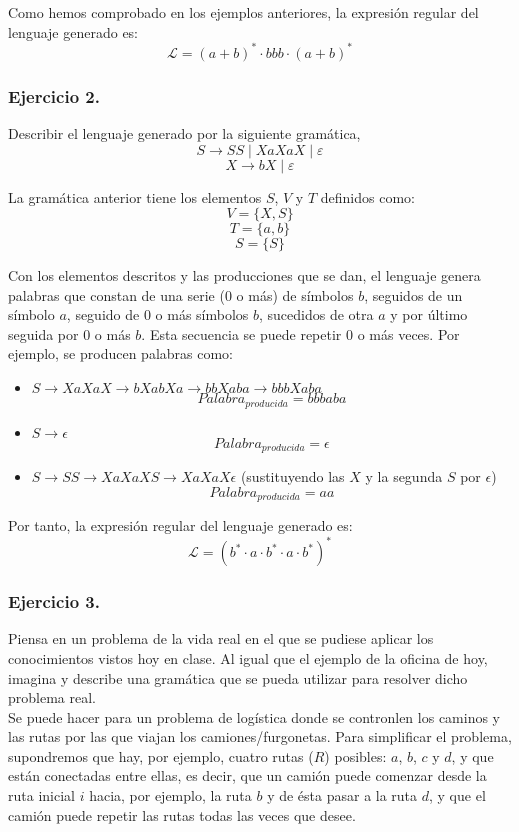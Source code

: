 \documentclass[11pt,a4paper]{article}
\begin{document}
Como hemos comprobado en los ejemplos anteriores, la expresión regular del lenguaje generado es:
	\[\mathcal{L}=(a+b)^{*}\cdot bbb\cdot (a+b)^{*}\]

\subsubsection{Ejercicio 2.} Describir el lenguaje generado por la siguiente gramática,\\
	\[S\rightarrow SS \mid XaXaX \mid \varepsilon \]
	\[X\rightarrow bX \mid \varepsilon\]
	
La gramática anterior tiene los elementos $S$, $V$ y $T$ definidos como:
	\[V=\{X,S\}\]
	\[T=\{a,b\}\]
	\[S=\{S\}\]
	
Con los elementos descritos y las producciones que se dan, el lenguaje genera palabras que constan de una serie (0 o más) de símbolos $b$, seguidos de un símbolo $a$, seguido de 0 o más símbolos $b$, sucedidos de otra $a$ y por último seguida por 0 o más $b$. Esta secuencia se puede repetir 0 o más veces. Por ejemplo, se producen palabras como:

	\begin{itemize}
	\item $S\rightarrow XaXaX\rightarrow bXabXa\rightarrow bbXaba\rightarrow bbbXaba$
	\[Palabra_{producida}=bbbaba\]
	\item $S\rightarrow \epsilon$
	\[Palabra_{producida}=\epsilon\]
	\item $S\rightarrow SS\rightarrow XaXaXS\rightarrow XaXaX\epsilon$ (sustituyendo las $X$ y la segunda $S$ por $\epsilon$)
	\[Palabra_{producida}=aa\]
	\end{itemize}
	
Por tanto, la expresión regular del lenguaje generado es:
	\[\mathcal{L}=(b^*\cdot a\cdot b^*\cdot a\cdot b^*)^*\]
	
\subsubsection{Ejercicio 3.} Piensa en un problema de la vida real en el que se pudiese aplicar los conocimientos vistos hoy en clase. Al igual que el ejemplo de la oficina de hoy, imagina y describe una gramática que se pueda utilizar para resolver dicho problema real.\\

Se puede hacer para un problema de logística donde se contronlen los caminos y las rutas por las que viajan los camiones/furgonetas. Para simplificar el problema, supondremos que hay, por ejemplo, cuatro rutas ($R$) posibles: $a$, $b$, $c$ y $d$, y que están conectadas entre ellas, es decir, que un camión puede comenzar desde la ruta inicial $i$ hacia, por ejemplo, la ruta $b$ y de ésta pasar a la ruta $d$, y que el camión puede repetir las rutas todas las veces que desee.\\
\end{document}
